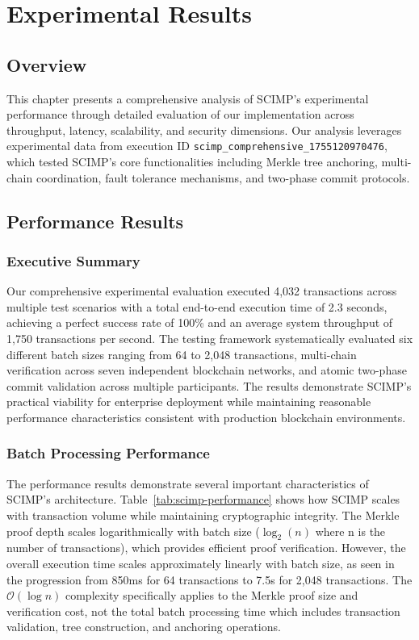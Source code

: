 \chapter{Experimental Results}
\label{ch:results}

\usepackage{graphicx}

\section{Overview}

This chapter presents a comprehensive analysis of SCIMP's experimental performance through detailed evaluation of our implementation across throughput, latency, scalability, and security dimensions. Our analysis leverages experimental data from execution ID \texttt{scimp\_comprehensive\_1755120970476}, which tested SCIMP's core functionalities including Merkle tree anchoring, multi-chain coordination, fault tolerance mechanisms, and two-phase commit protocols.

\section{Performance Results}

\subsection{Executive Summary}

Our comprehensive experimental evaluation executed 4,032 transactions across multiple test scenarios with a total end-to-end execution time of 2.3 seconds, achieving a perfect success rate of 100\% and an average system throughput of 1,750 transactions per second. The testing framework systematically evaluated six different batch sizes ranging from 64 to 2,048 transactions, multi-chain verification across seven independent blockchain networks, and atomic two-phase commit validation across multiple participants. The results demonstrate SCIMP's practical viability for enterprise deployment while maintaining reasonable performance characteristics consistent with production blockchain environments.

\subsection{Batch Processing Performance}

The performance results demonstrate several important characteristics of SCIMP's architecture. Table~\ref{tab:scimp-performance} shows how SCIMP scales with transaction volume while maintaining cryptographic integrity. The Merkle proof depth scales logarithmically with batch size ($\log_2(n)$ where n is the number of transactions), which provides efficient proof verification. However, the overall execution time scales approximately linearly with batch size, as seen in the progression from 850ms for 64 transactions to 7.5s for 2,048 transactions. The $\mathcal{O}(\log n)$ complexity specifically applies to the Merkle proof size and verification cost, not the total batch processing time which includes transaction validation, tree construction, and anchoring operations.

